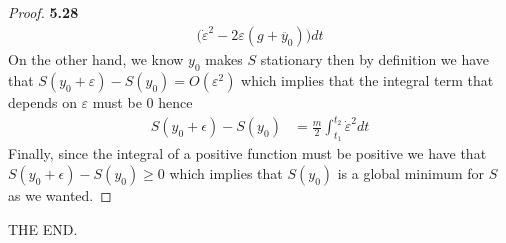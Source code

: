 \documentclass[11pt]{article}
\theoremstyle{definition}
\begin{document}
\begin{proof}{\textbf{5.28}}
\begin{align*}
        \bigg(\dot{\varepsilon}^2 - 2\varepsilon(g + \ddot{y_0})\bigg)dt
    \end{align*}
    On the other hand, we know $y_0$ makes $S$ stationary then by definition
    we have that $S(y_0 + \varepsilon) - S(y_0) = O(\varepsilon^2)$ which
    implies that the integral term that depends on $\varepsilon$ must be $0$
    hence
    \begin{align*}
        S(y_0 + \epsilon) - S(y_0)
        &= \frac{m}{2}\int_{t_1}^{t_2} \dot{\varepsilon}^2dt
    \end{align*}
    Finally, since the integral of a positive function must be positive
    we have that $S(y_0 + \epsilon) - S(y_0) \geq 0$ which implies that
    $S(y_0)$ is a global minimum for $S$ as we wanted.
\end{proof}

THE END.
\end{document}
